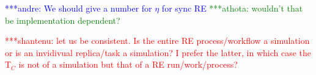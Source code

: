 \documentclass{rspublic}
\newcommand{\jhanote}[1]{ {\textcolor{red} { ***shantenu: #1 }}}
\newcommand{\alnote}[1]{ {\textcolor{blue} { ***andre: #1 }}}
\newcommand{\athotanote}[1]{ {\textcolor{green} { ***athota: #1 }}}
\newcommand{\alnote}[1]{}
\newcommand{\athotanote}[1]{}
\newcommand{\jhanote}[1]{}
\begin{document}
\alnote{We should give a number for $\eta$ for sync RE}\athotanote{wouldn't that be implementation dependent?}


\jhanote{let us be consistent. Is the entire RE process/workflow a  simulation or is an invidivual replica/task a simulation? I prefer  the latter, in which case the T$_C$ is not of a simulation but that  of a RE run/work/process?}  %
\end{document}
